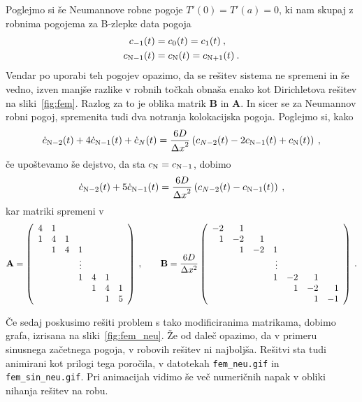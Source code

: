 \documentclass{porocilo}
\begin{document}
\newpage
Poglejmo si še Neumannove robne pogoje $T'(0) = T'(a) = 0$, ki nam skupaj z robnima pogojema za B-zlepke data pogoja
\begin{align*}
    c_{\rm -1}(t)  & = c_0(t)        = c_{\rm 1}(t) \>,   \\
    c_{\rm N-1}(t) & = c_{\rm N}(t)  = c_{\rm N+1}(t) \>.
\end{align*}
Vendar po uporabi teh pogojev opazimo, da se rešitev sistema ne spremeni in še vedno, izven manjše razlike v robnih točkah obnaša enako kot Dirichletova rešitev na sliki~\ref{fig:fem}. Razlog za to je oblika matrik $\mathbf{B}$ in  $\mathbf{A}$. In sicer se za Neumannov robni pogoj, spremenita tudi dva notranja kolokacijska pogoja. Poglejmo si, kako
\begin{equation*}
    \dot{c}_{\rm N-2}(t) + 4\dot{c}_{\rm N-1}(t) + \dot{c}_{N}(t)
    = {\frac{6D}{{\Delta x}^2}} \left(c_{N-2}(t) - 2c_{\rm N-1}(t) + c_{\rm N}(t) \right) \>,
\end{equation*}
če upoštevamo še dejstvo, da sta $c_{\rm N} = c_{\rm N-1}$, dobimo
\begin{equation*}
    \dot{c}_{\rm N-2}(t) + 5 \dot{c}_{\rm N-1}(t)
    = {\frac{6D}{{\Delta x}^2}} \left(c_{N-2}(t) - c_{\rm N-1}(t)\right) \>,
\end{equation*}
kar matriki spremeni v
\[
    \mathbf{A} = \left(
    \begin{array}{ccccccc}
            4 & 1 \cr
            1 & 4     & 1 \cr
              & 1     & 4     & 1 \cr
              &       &       & \vdots \cr
              &       &       & 1          & 4 & 1 & \cr
              &       &       &            & 1 & 4 & 1 \cr
              &       &       &            &   & 1 & 5
        \end{array}
    \right) \>, \qquad
    \mathbf{B} = {\frac{6 D}{\Delta{x^2}}} \left({
        \begin{array}{rrrrrrr}
            -2 & 1 \cr
            1  & -2    & 1 \cr
               & 1     & -2    & 1 \cr
               &       &       & \vdots \cr
               &       &       & 1          & -2 & 1  & \cr
               &       &       &            & 1  & -2 & 1 \cr
               &       &       &            &    & 1  & -1
        \end{array}
    }\right) \>.
\]

\newpage
Če sedaj poskusimo rešiti problem s tako modificiranima matrikama, dobimo grafa, izrisana na sliki~\ref{fig:fem_neu}. Že od daleč opazimo, da v primeru sinusnega začetnega pogoja, v robovih rešitev ni najboljša. Rešitvi sta tudi animirani kot prilogi tega poročila, v datotekah \texttt{fem\_neu.gif} in \texttt{fem\_sin\_neu.gif}. Pri animacijah vidimo še več numeričnih napak v obliki nihanja rešitev na robu.
\end{document}
